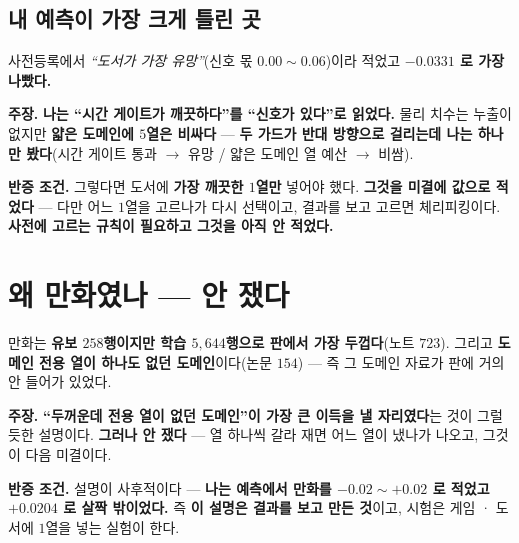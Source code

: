 \documentclass[10pt,a4paper]{article}
\newcommand{\claim}[2]{\begin{claimbox}\textbf{주장.} #1\par\smallskip
  \textcolor{gray!70}{\textbf{반증 조건.} #2}\end{claimbox}}
\begin{document}
\subsection*{내 예측이 가장 크게 틀린 곳}

사전등록에서 \emph{``도서가 가장 유망''}(신호 몫 $0.00 \sim 0.06$)이라 적었고
\textbf{$-0.0331$ 로 가장 나빴다.}

\claim{\textbf{나는 ``시간 게이트가 깨끗하다''를 ``신호가 있다''로 읽었다.} 물리
치수는 누출이 없지만 \textbf{얇은 도메인에 $5$열은 비싸다} --- \textbf{두 가드가 반대
방향으로 걸리는데 나는 하나만 봤다}(시간 게이트 통과 $\to$ 유망 / 얇은 도메인 열
예산 $\to$ 비쌈).}
{그렇다면 도서에 \textbf{가장 깨끗한 $1$열만} 넣어야 했다. \textbf{그것을 미결에
값으로 적었다} --- 다만 어느 $1$열을 고르나가 다시 선택이고, 결과를 보고 고르면
체리피킹이다. \textbf{사전에 고르는 규칙이 필요하고 그것을 아직 안 적었다.}}

\section{왜 만화였나 --- 안 쟀다}

만화는 \textbf{유보 $258$행이지만 학습 $5{,}644$행으로 판에서 가장 두껍다}(노트
$723$). 그리고 \textbf{도메인 전용 열이 하나도 없던 도메인}이다(논문 $154$) --- 즉
그 도메인 자료가 판에 거의 안 들어가 있었다.

\claim{\textbf{``두꺼운데 전용 열이 없던 도메인''이 가장 큰 이득을 낼 자리였다}는 것이
그럴듯한 설명이다. \textbf{그러나 안 쟀다} --- 열 하나씩 갈라 재면 어느 열이 냈나가
나오고, 그것이 다음 미결이다.}
{설명이 사후적이다 --- \textbf{나는 예측에서 만화를 $-0.02 \sim +0.02$ 로 적었고
$+0.0204$ 로 살짝 밖이었다.} 즉 \textbf{이 설명은 결과를 보고 만든 것}이고, 시험은
게임 · 도서에 $1$열을 넣는 실험이 한다.}
\end{document}
